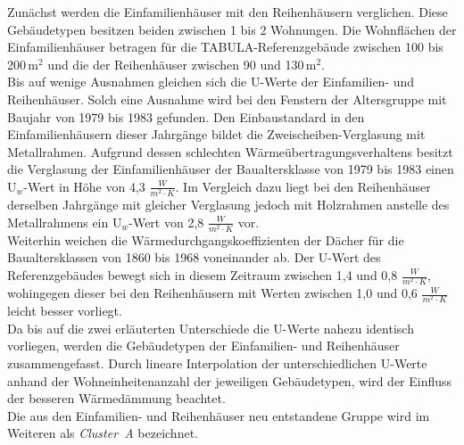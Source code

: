 Zunächst werden die Einfamilienhäuser mit den Reihenhäusern verglichen.
Diese Gebäudetypen besitzen beiden zwischen 1 bis 2 Wohnungen.
Die Wohnflächen der Einfamilienhäuser betragen für die TABULA-Referenzgebäude zwischen 100 bis 200\,m\(^2\) und die der Reihenhäuser zwischen 90 und 130\,m\(^2\).\\
Bis auf wenige Ausnahmen gleichen sich die U-Werte der Einfamilien- und Reihenhäuser.
Solch eine Ausnahme wird bei den Fenstern der Altersgruppe mit Baujahr von 1979 bis 1983 gefunden.
Den Einbaustandard in den Einfamilienhäusern dieser Jahrgänge bildet die Zweischeiben-Verglasung mit Metallrahmen.
Aufgrund dessen schlechten Wärmeübertragungsverhaltens besitzt die Verglasung der Einfamilienhäuser der Baualtersklasse von 1979 bis 1983 einen U\(_w\)-Wert in Höhe von 4,3 \(\frac{W}{m^2 \cdot K}\).
Im Vergleich dazu liegt bei den Reihenhäuser derselben Jahrgänge mit gleicher Verglasung jedoch mit Holzrahmen anstelle des Metallrahmens ein U\(_w\)-Wert von 2,8 \(\frac{W}{m^2 \cdot K}\) vor.\\
Weiterhin weichen die Wärmedurchgangskoeffizienten der Dächer für die Baualtersklassen von 1860 bis 1968 voneinander ab.
Der U-Wert des Referenzgebäudes bewegt sich in diesem Zeitraum zwischen 1,4 und 0,8 \(\frac{W}{m^2 \cdot K}\), wohingegen dieser bei den Reihenhäusern mit Werten zwischen 1,0 und 0,6 \(\frac{W}{m^2 \cdot K}\) leicht besser vorliegt.\\
Da bis auf die zwei erläuterten Unterschiede die U-Werte nahezu identisch vorliegen, werden die Gebäudetypen der Einfamilien- und Reihenhäuser zusammengefasst.
Durch lineare Interpolation der unterschiedlichen U-Werte anhand der Wohneinheitenanzahl der jeweiligen Gebäudetypen, wird der Einfluss der besseren Wärmedämmung beachtet.\\
Die aus den Einfamilien- und Reihenhäuser neu entstandene Gruppe wird im Weiteren als \mbox{\textit{Cluster A}} bezeichnet. \cite{.2015}

